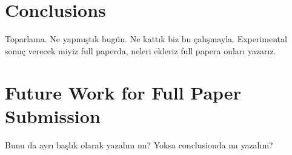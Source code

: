 \documentclass[a4paper,11pt]{article}
\begin{document}
\section{\normalsize\textbf{Conclusions}}
Toparlama. Ne yapmıştık bugün. Ne kattık biz bu çalışmayla. Experimental sonuç verecek miyiz full paperda, neleri ekleriz full papera onları yazarız.

\section{\normalsize\textbf{Future Work for Full Paper Submission}}
Bunu da ayrı başlık olarak yazalım mı? Yoksa conclusionda mı yazalım?

\AtNextBibliography{\tiny}
\printbibliography
\end{document}
